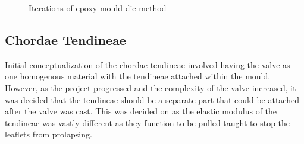 \begin{figure}
    \begin{fullwidth}
        \centering
        \quad
        \quad
        \quad
        \caption{Iterations of epoxy mould die method}
        \label{fig:moulddie}
    \end{fullwidth}
\end{figure}


\subsection{Chordae Tendineae}\label{sec:Chord}
Initial conceptualization of the chordae tendineae involved having the valve as one homogenous material with the tendineae attached within the mould. However, as the project progressed and the complexity of the valve increased, it was decided that the tendineae should be a separate part that could be attached after the valve was cast. This was decided on as the elastic modulus of the tendineae was vastly different as they function to be pulled taught to stop the leaflets from prolapsing.

